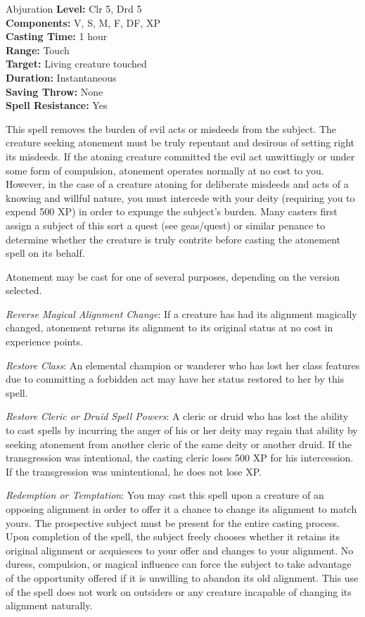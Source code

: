 {Abjuration}
{
	\textbf{Level:}
	Clr 5, Drd 5\\
	\textbf{Components:}
	V, S, M, F, DF, XP\\
	\textbf{Casting Time:}
	1 hour\\
	\textbf{Range:}
	Touch\\
	\textbf{Target:}
	Living creature touched\\
	\textbf{Duration:}
	Instantaneous\\
	\textbf{Saving Throw:}
	None\\
	\textbf{Spell Resistance:}
	Yes\\
}
{
	This spell removes the burden of evil acts or misdeeds from the subject. The creature seeking atonement must be truly repentant and desirous of setting right its misdeeds. If the atoning creature committed the evil act unwittingly or under some form of compulsion, atonement operates normally at no cost to you. However, in the case of a creature atoning for deliberate misdeeds and acts of a knowing and willful nature, you must intercede with your deity (requiring you to expend 500 XP) in order to expunge the subject's burden. Many casters first assign a subject of this sort a quest (see geas/quest) or similar penance to determine whether the creature is truly contrite before casting the atonement spell on its behalf.

	Atonement may be cast for one of several purposes, depending on the version selected.

	\textit{Reverse Magical Alignment Change}:
	If a creature has had its alignment magically changed, atonement returns its alignment to its original status at no cost in experience points.

	\textit{Restore Class}:
	An elemental champion or wanderer who has lost her class features due to committing a forbidden act may have her status restored to her by this spell.

	\textit{Restore Cleric or Druid Spell Powers}:
	A cleric or druid who has lost the ability to cast spells by incurring the anger of his or her deity may regain that ability by seeking atonement from another cleric of the same deity or another druid. If the transgression was intentional, the casting cleric loses 500 XP for his intercession. If the transgression was unintentional, he does not lose XP.

	\textit{Redemption or Temptation}:
	You may cast this spell upon a creature of an opposing alignment in order to offer it a chance to change its alignment to match yours. The prospective subject must be present for the entire casting process. Upon completion of the spell, the subject freely chooses whether it retains its original alignment or acquiesces to your offer and changes to your alignment. No duress, compulsion, or magical influence can force the subject to take advantage of the opportunity offered if it is unwilling to abandon its old alignment. This use of the spell does not work on outsiders or any creature incapable of changing its alignment naturally.

}
